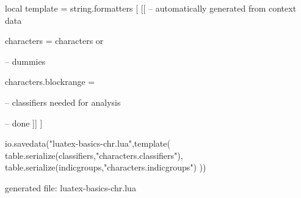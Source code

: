 local template = string.formatters [ [[
-- automatically generated from context data

characters = characters or { }

-- dummies

characters.blockrange = { }

-- classifiers needed for analysis



-- done
]] ]

io.savedata("luatex-basics-chr.lua",template(
    table.serialize(classifiers,"characters.classifiers"),
    table.serialize(indicgroups,"characters.indicgroups")
))

\stopluacode

\startTEXpage[offset=10pt]
    \tttf generated file: luatex-basics-chr.lua
\stopTEXpage
